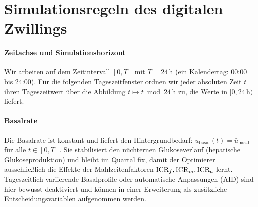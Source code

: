 \section{Simulationsregeln des digitalen Zwillings}

\paragraph{Zeitachse und Simulationshorizont} Wir arbeiten auf dem Zeitintervall \([0,T]\) mit \(T=24\,\mathrm{h}\) (ein Kalendertag: 00{:}00 bis 24{:}00). Für die folgenden Tageszeitfenster ordnen wir jeder absoluten Zeit \(t\) ihren Tageszeitwert über die Abbildung \(t \mapsto t \bmod 24\,\mathrm{h}\) zu, die Werte in \([0,24\,\mathrm{h})\) liefert.
\medskip
\newcommand{\ubasal}{\bar u_{\mathrm{basal}}}
\paragraph{Basalrate}
Die Basalrate ist konstant und liefert den Hintergrundbedarf: $u_{\mathrm{basal}}(t)=\ubasal$ für alle $t\in[0,T]$. Sie stabilisiert den nüchternen Glukoseverlauf (hepatische Glukoseproduktion) und bleibt im Quartal fix, damit der Optimierer ausschließlich die Effekte der Mahlzeitenfaktoren $\mathrm{ICR}_f,\mathrm{ICR}_m,\mathrm{ICR}_a$ lernt. Tageszeitlich variierende Basalprofile oder automatische Anpassungen (AID) sind hier bewusst deaktiviert und können in einer Erweiterung als zusätzliche Entscheidungsvariablen aufgenommen werden.

\newcommand{\tod}{\mathrm{tod}}
\medskip

